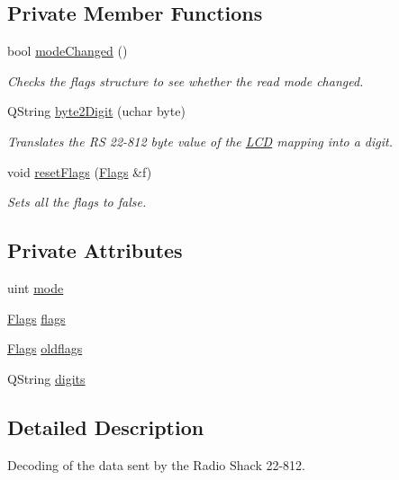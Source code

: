 \subsection*{Private Member Functions}
\begin{DoxyCompactItemize}
\item 
bool \hyperlink{class_r_s22812_a551bff514434f8710316a06c529d1f3c}{mode\-Changed} ()
\begin{DoxyCompactList}\small\item\em Checks the flags structure to see whether the read mode changed. \end{DoxyCompactList}\item 
Q\-String \hyperlink{class_r_s22812_aee6ba6536ad3d47239501d812d5db994}{byte2\-Digit} (uchar byte)
\begin{DoxyCompactList}\small\item\em Translates the R\-S 22-\/812 byte value of the \hyperlink{class_l_c_d}{L\-C\-D} mapping into a digit. \end{DoxyCompactList}\item 
void \hyperlink{class_r_s22812_a64f4658259e355d64dcaaa92eac65e93}{reset\-Flags} (\hyperlink{struct_flags}{Flags} \&f)
\begin{DoxyCompactList}\small\item\em Sets all the flags to false. \end{DoxyCompactList}\end{DoxyCompactItemize}
\subsection*{Private Attributes}
\begin{DoxyCompactItemize}
\item 
uint \hyperlink{class_r_s22812_a368cc94b2c66bdc6d456e413de9217be}{mode}
\item 
\hyperlink{struct_flags}{Flags} \hyperlink{class_r_s22812_a6c8e4c27f876fdfd10bf153b36bd6254}{flags}
\item 
\hyperlink{struct_flags}{Flags} \hyperlink{class_r_s22812_a167304591d2e351f70975b608718946b}{oldflags}
\item 
Q\-String \hyperlink{class_r_s22812_a4514e9e982441cab9143a9c36a64429c}{digits}
\end{DoxyCompactItemize}


\subsection{Detailed Description}
Decoding of the data sent by the Radio Shack 22-\/812. 


